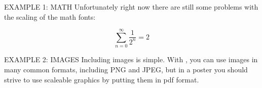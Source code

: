 \documentclass[final]{beamer}
\begin{document}
\begin{frame}[t, fragile]
\begin{columns}[T]
\begin{column}{0.32\linewidth}
\begin{block}{EXAMPLE 1: MATH}
	Unfortunately right now there are still some problems with the scaling of the math fonts:

	\begin{equation}
		\sum_{n=0}^\infty \frac{1}{2^n} = 2
	\end{equation}
	


\end{block}
	
	
\begin{block}{EXAMPLE 2: IMAGES}
	Including images is simple. With \pdfLaTeX, you can use images in many common formats, including PNG and JPEG, but in a poster you should strive to use scaleable graphics by putting them in pdf format.



\end{block}
	
\end{column}

\end{columns}
\end{frame}
\end{document}

